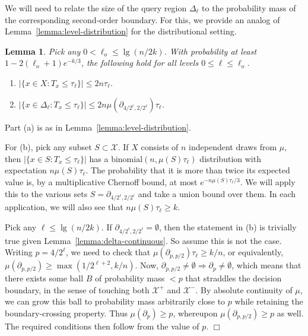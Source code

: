 \documentclass{article}
\def\X{{\mathcal X}}
\newtheorem{lemma}[thm]{Lemma}
\newenvironment{proof}{\noindent {\sc Proof:}}{$\Box$ \medskip}
\begin{document}
We will need to relate the size of the query region $\Delta_\ell$ to the probability mass of the corresponding second-order boundary. For this, we provide an analog of Lemma~\ref{lemma:level-distribution} for the distributional setting.
\begin{lemma}
Pick any $0 < \ell_o \leq \lg (n/2k)$. With probability at least $1-2(\ell_o+1)e^{-k/3}$, the following hold for all levels $0 \leq \ell \leq \ell_o$.
\begin{enumerate}
\item[(a)] $|\{x \in X: T_x \leq \tau_\ell\}| \leq 2 n \tau_\ell$.
\item[(b)] $|\{x \in \Delta_{\ell}: T_x \leq \tau_\ell\}| \leq 2 n \mu(\partial_{4/2^\ell, 2/2^\ell}) \tau_\ell$.
\end{enumerate}
\label{lemma:level-distribution-dist}
\end{lemma}
\begin{proof} 
Part (a) is as in Lemma~\ref{lemma:level-distribution}. 

For (b), pick any subset $S \subset \X$. If $X$ consists of $n$ independent draws from $\mu$, then $|\{x \in S: T_x \leq \tau_\ell\}|$ has a $\mbox{binomial}(n, \mu(S) \tau_\ell)$ distribution with expectation $n \mu(S) \tau_\ell$. The probability that it is more than twice its expected value is, by a multiplicative Chernoff bound, at most $e^{-n \mu(S) \tau_\ell/3}$. We will apply this to the various sets $S = \partial_{4/2^\ell, 2/2^\ell}$ and take a union bound over them. In each application, we will also see that $n \mu(S) \tau_\ell \geq k$.

Pick any $\ell \leq \lg (n/2k)$. If $\partial_{4/2^\ell, 2/2^\ell} = \emptyset$, then the statement in (b) is trivially true given Lemma~\ref{lemma:delta-continuous}. So assume this is not the case. Writing $p = 4/2^\ell$, we need to check that $\mu(\partial_{p, p/2}) \tau_\ell \geq k/n$, or equivalently, $\mu(\partial_{p, p/2}) \geq \max(1/2^{\ell+2}, k/n)$. Now, $\partial_{p,p/2} \neq \emptyset \Longrightarrow \partial_p \neq \emptyset$, which means that there exists some ball $B$ of probability mass $<p$ that straddles the decision boundary, in the sense of touching both $\X^+$ and $\X^-$. By absolute continuity of $\mu$, we can grow this ball to probability mass arbitrarily close to $p$ while retaining the boundary-crossing property. Thus $\mu(\partial_p) \geq p$, whereupon $\mu(\partial_{p,p/2}) \geq p$ as well. The required conditions then follow from the value of $p$.
\end{proof}
\end{document}
